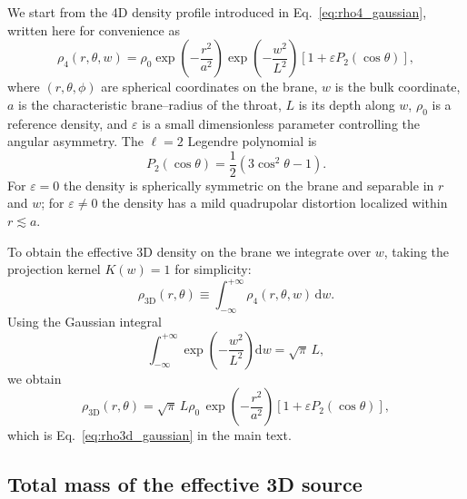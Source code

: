 \documentclass[12pt]{article}
\begin{document}
We start from the 4D density profile introduced in
Eq.~\eqref{eq:rho4_gaussian}, written here for convenience as
\begin{equation}
  \rho_4(r,\theta,w)
  = \rho_0
    \exp\!\left(-\frac{r^2}{a^2}\right)
    \exp\!\left(-\frac{w^2}{L^2}\right)
    \left[1 + \varepsilon P_2(\cos\theta)\right],
  \label{eq:app_rho4}
\end{equation}
where $(r,\theta,\phi)$ are spherical coordinates on the brane,
$w$ is the bulk coordinate, $a$ is the characteristic brane--radius of the
throat, $L$ is its depth along $w$, $\rho_0$ is a reference density, and
$\varepsilon$ is a small dimensionless parameter controlling the angular
asymmetry.  The $\ell=2$ Legendre polynomial is
\begin{equation}
  P_2(\cos\theta)
  = \frac{1}{2}(3\cos^2\theta - 1).
\end{equation}
For $\varepsilon=0$ the density is spherically symmetric on the brane and
separable in $r$ and $w$; for $\varepsilon\neq 0$ the density has a mild
quadrupolar distortion localized within $r\lesssim a$.

To obtain the effective 3D density on the brane we integrate over $w$,
taking the projection kernel $K(w)=1$ for simplicity:
\begin{equation}
  \rho_{\mathrm{3D}}(r,\theta)
  \equiv \int_{-\infty}^{+\infty}
          \rho_4(r,\theta,w)\,\mathrm{d}w.
\end{equation}
Using the Gaussian integral
\begin{equation}
  \int_{-\infty}^{+\infty}
    \exp\!\left(-\frac{w^2}{L^2}\right)\mathrm{d}w
  = \sqrt{\pi}\,L,
\end{equation}
we obtain
\begin{equation}
  \rho_{\mathrm{3D}}(r,\theta)
  = \sqrt{\pi}\,L\rho_0\,
    \exp\!\left(-\frac{r^2}{a^2}\right)
    \left[1 + \varepsilon P_2(\cos\theta)\right],
  \label{eq:app_rho3d}
\end{equation}
which is Eq.~\eqref{eq:rho3d_gaussian} in the main text.

\subsection{Total mass of the effective 3D source}
\end{document}

